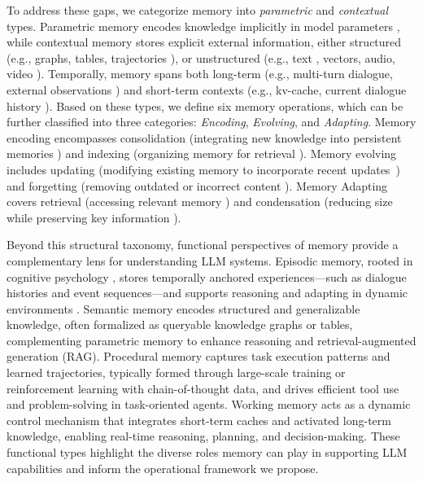\documentclass[manuscript,screen]{acmart}
\begin{document}
To address these gaps, we categorize memory into \textit{parametric} and \textit{contextual} types. Parametric memory encodes knowledge implicitly in model parameters \citep{wang2024wise}, while contextual memory stores explicit external information, either structured (e.g., graphs, tables, trajectories \citep{rasmussen2025zep}), or unstructured (e.g., text \citep{zhong2024memorybank}, vectors, audio, video \citep{long2025seeinglisteningrememberingreasoning}). Temporally, memory spans both long-term (e.g., multi-turn dialogue, external observations \citep{li2024hello}) and short-term contexts (e.g., kv-cache, current dialogue history \citep{packer2023memgpt}). Based on these types, we define six memory operations, which can be further classified into three categories: \textit{Encoding}, \textit{Evolving}, and \textit{Adapting}. Memory encoding encompasses consolidation (integrating new knowledge into persistent memories \citep{feng2024tasl}) and indexing (organizing memory for retrieval \citep{wu2024longmemeval}). Memory evolving includes updating (modifying existing memory to incorporate recent updates~\citep{chen2024compress}) and forgetting (removing outdated or incorrect content \citep{tian2024forget}). Memory Adapting covers retrieval (accessing relevant memory \citep{gutierrez2024hipporag}) and condensation (reducing size while preserving key information \citep{chen2024compress}).

Beyond this structural taxonomy, functional perspectives of memory provide a complementary lens for understanding LLM systems. Episodic memory, rooted in cognitive psychology \citep{tulving1972episodic}, stores temporally anchored experiences—such as dialogue histories and event sequences—and supports reasoning and adapting in dynamic environments \citep{fountas2024human, miao2024episodic}. Semantic memory encodes structured and generalizable knowledge, often formalized as queryable knowledge graphs or tables, complementing parametric memory to enhance reasoning and retrieval-augmented generation (RAG). Procedural memory captures task execution patterns and learned trajectories, typically formed through large-scale training or reinforcement learning with chain-of-thought data, and drives efficient tool use and problem-solving in task-oriented agents. Working memory acts as a dynamic control mechanism that integrates short-term caches and activated long-term knowledge, enabling real-time reasoning, planning, and decision-making. These functional types highlight the diverse roles memory can play in supporting LLM capabilities and inform the operational framework we propose.
\end{document}
